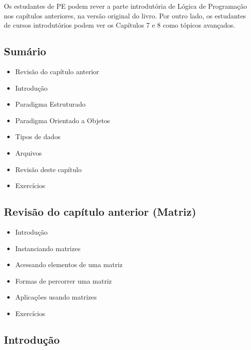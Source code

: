 \documentclass[12pt,a4paper]{article}
\providecommand{\tightlist}{%
      \setlength{\itemsep}{0pt}\setlength{\parskip}{0pt}}
\begin{document}
Os estudantes de PE podem rever a parte introdutória de Lógica de
Programação nos capítulos anteriores, na versão original do livro. Por
outro lado, os estudantes de cursos introdutórios podem ver os Capítulos
7 e 8 como tópicos avançados.

    \hypertarget{sumuxe1rio}{%
\subsection{Sumário}\label{sumuxe1rio}}

\begin{itemize}
\tightlist
\item
  Revisão do capítulo anterior
\item
  Introdução
\item
  Paradigma Estruturado
\item
  Paradigma Orientado a Objetos
\item
  Tipos de dados
\item
  Arquivos
\item
  Revisão deste capítulo
\item
  Exercícios
\end{itemize}

    \hypertarget{revisuxe3o-do-capuxedtulo-anterior-matriz}{%
\subsection{Revisão do capítulo anterior
(Matriz)}\label{revisuxe3o-do-capuxedtulo-anterior-matriz}}

    \begin{itemize}
\tightlist
\item
  Introdução
\item
  Instanciando matrizes
\item
  Acessando elementos de uma matriz
\item
  Formas de percorrer uma matriz
\item
  Aplicações usando matrizes
\item
  Exercícios
\end{itemize}

    \hypertarget{introduuxe7uxe3o}{%
\subsection{Introdução}\label{introduuxe7uxe3o}}
\end{document}
